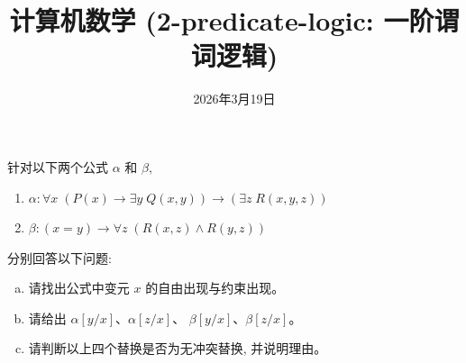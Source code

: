 \documentclass[a4paper, justified]{tufte-handout}
\title{计算机数学 (2-predicate-logic: 一阶谓词逻辑)}
\date{2026年3月19日}
\begin{document}
\maketitle
\noplagiarism %
\begin{abstract}
\end{abstract}
\beginrequired

\newpage
\begin{problem}
  针对以下两个公式 $\alpha$ 和 $\beta$,
  \begin{enumerate}[(1)]
    \item $\alpha: \forall x\; (P(x) \to \exists y\; Q(x, y))
      \to (\exists z\; R(x, y, z))$
    \item $\beta: (x = y) \to \forall z\; (R(x, z) \land R(y, z))$
  \end{enumerate}
  分别回答以下问题:
  \begin{enumerate}[(a)]
    \item 请找出公式中变元 $x$ 的自由出现与约束出现。
    \item 请给出 $\alpha[y/x]$、$\alpha[z/x]$、
      $\beta[y/x]$、$\beta[z/x]$。
    \item 请判断以上四个替换是否为无冲突替换, 并说明理由。
  \end{enumerate}
\end{problem}
\end{document}
